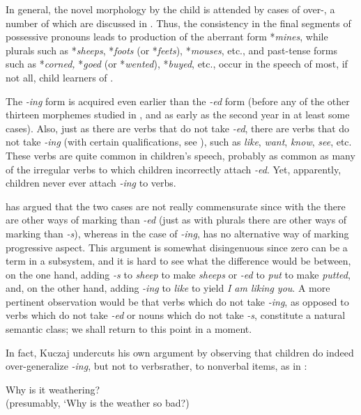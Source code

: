 In general, the  novel morphology by the child is attended by cases of over-, a number of which are dis\-cussed in \citet{Cazden1968}. Thus, the consistency in the final segments of possessive pronouns leads to production of the aberrant form *\textit{mines}, while plurals such as *\textit{sheeps}, *\textit{foots} (or *\textit{feets}), *\textit{mouses}, etc., and past-tense forms such as *\textit{corned,} *\textit{goed} (or *\textit{wented}), *\textit{buyed}, etc., occur in the speech of most, if not all, child learners of .

The \textit{-ing} form is acquired even earlier than the \textit{-ed} form (before any of the other thirteen morphemes studied in \citet{Brown1973}, and as early as the second year in at least some cases). Also, just as there are verbs that do not take \textit{-ed}, there are verbs that do not take \textit{-ing} (with certain qualifications, see \citealt{Sag1973}), such as \textit{like}, \textit{want}, \textit{know}, \textit{see}, etc. These verbs are quite common in children's speech, probably as common as many of the irregular verbs to which children incor\-rectly attach \textit{-ed}. Yet, apparently, children never ever attach \textit{-ing} to  verbs.

\citet{Kuczaj1978} has argued that the two cases are not really commensurate since with the  there are other ways of mark\-ing than \textit{-ed} (just as with plurals there are other ways of marking than \textit{-s}), whereas in the case of \textit{-ing},  has no alternative way of marking progressive aspect. This argument is somewhat disingenuous since zero can be a term in a subsystem, and it is hard to see what the difference would be between, on the one hand, adding \textit{-s} to \textit{sheep} to make \textit{sheeps} or \textit{-ed} to \textit{put} to make \textit{putted}, and, on the other hand, adding \textit{-ing} to \textit{like} to yield \textit{I am liking you}. A more pertinent observa\-tion would be that verbs which do not take \textit{-ing}, as opposed to verbs which do not take \textit{-ed} or nouns which do not take \textit{-s}, constitute a natural semantic class; we shall return to this point in a moment.

In fact, Kuczaj undercuts his own argument by observing that children do indeed over-generalize \textit{-ing}, but not to  verbs\-rather, to nonverbal items, as in :

\ea\label{ex:3:15}
 Why is it weathering?\\
\glt (presumably, `Why is the weather so bad?)
\z

